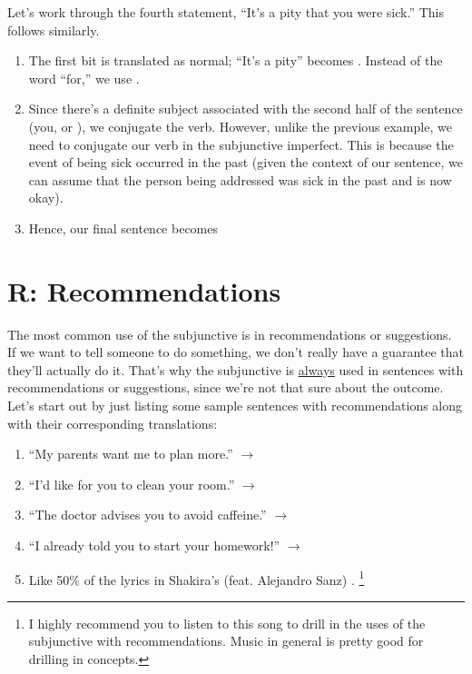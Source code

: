 Let's work through the fourth statement, ``It's a pity that you were sick.'' This follows similarly. 
\begin{enumerate}
	\item The first bit is translated as normal; ``It's a pity'' becomes . Instead of the word ``for,'' we use . 
	\item Since there's a definite subject associated with the second half of the sentence (you, or ), we conjugate the verb. However, unlike the previous example, we need to conjugate our verb in the subjunctive imperfect. This is because the event of being sick occurred in the past (given the context of our sentence, we can assume that the person being addressed was sick in the past and is now okay).
	\item Hence, our final sentence becomes 
\end{enumerate}

\section{R: Recommendations}

The most common use of the subjunctive is in recommendations or suggestions. \\

If we want to tell someone to do something, we don't really have a guarantee that they'll actually do it. That's why the subjunctive is \underline{always} used in sentences with recommendations or suggestions, since we're not that sure about the outcome.\\

Let's start out by just listing some sample sentences with recommendations along with their corresponding translations:
\begin{enumerate}[noitemsep]
	\item ``My parents want me to plan more.'' $\rightarrow$ 
	\item ``I'd like for you to clean your room.'' $\rightarrow$ 
	\item ``The doctor advises you to avoid caffeine.'' $\rightarrow$ 
	\item ``I already told you to start your homework!'' $\rightarrow$ 
	\item Like 50\% of the lyrics in Shakira's (feat. Alejandro Sanz) . \footnote{I highly recommend you to listen to this song to drill in the uses of the subjunctive with recommendations. Music in general is pretty good for drilling in concepts. }
\end{enumerate}

